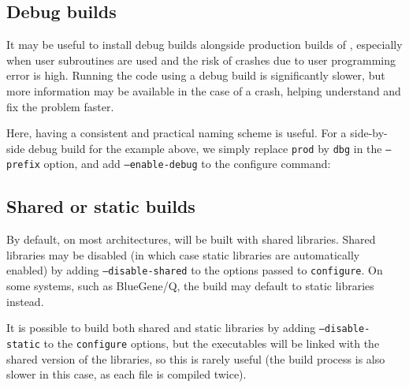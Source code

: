 \documentclass[a4paper,10pt,twoside]{csshortdoc}
\begin{document}
\subsection{Debug builds\label{sec:config:shared}}

It may be useful to install debug builds alongside production
builds of \CS, especially when user subroutines are used
and the risk of crashes due to user programming error is high.
Running the code using a debug build is significantly
slower, but more information may be available in the case
of a crash, helping understand and fix the problem faster.

Here, having a consistent and practical naming scheme is useful.
For a side-by-side debug build for the example above, we simply replace \texttt{prod} by
\texttt{dbg} in the \texttt{--prefix} option, and add
\texttt{--enable-debug} to the configure command:


\subsection{Shared or static builds\label{sec:config:shared}}

By default, on most architectures, \CS will be built with shared libraries.
Shared libraries may be disabled (in which case static libraries
are automatically enabled) by adding  {\tt --disable-shared} to the options
passed to {\tt configure}.
On some systems, such as BlueGene/Q, the build may default to static libraries
instead.

It is possible to build both shared and static libraries by adding
{\tt --disable-static} to the {\tt configure} options, but the
executables will be linked with the shared version of the libraries,
so this is rarely useful (the build process is also slower in this case, as
each file is compiled twice).
\end{document}
